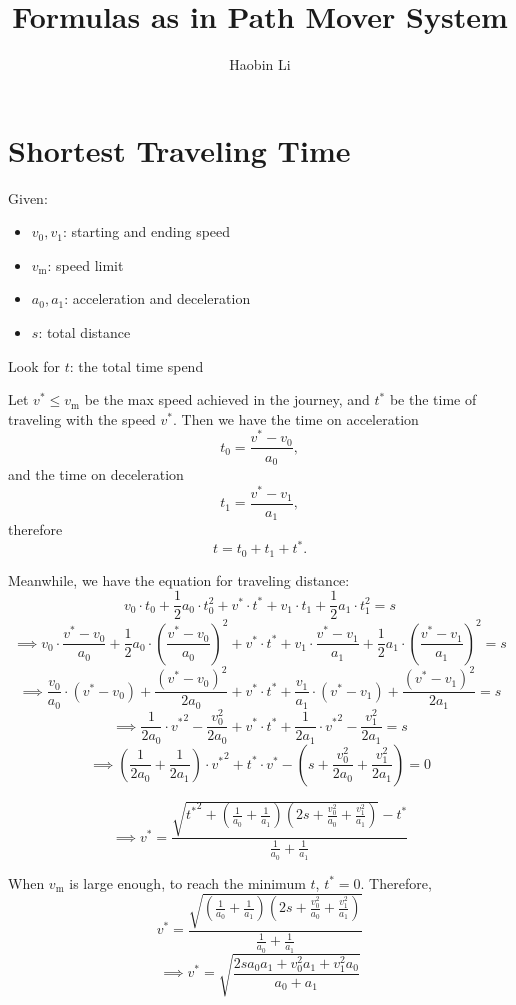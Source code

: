 \documentclass[11pt,a4paper]{article}
\title{Formulas as in Path Mover System}
\author{Haobin Li}
\begin{document}
\maketitle

\section{Shortest Traveling Time}

Given:

\begin{itemize}
	\item $v_0, v_1$: starting and ending speed
	\item $v_\text{m}$: speed limit
	\item $a_0, a_1$: acceleration and deceleration
	\item $s$: total distance
\end{itemize}

Look for $t$: the total time spend

Let $v^* \leq v_\text{m}$ be the max speed achieved in the journey, and $t^*$ be the time of traveling with the speed $v^*$. Then we have the time on acceleration $$ t_0 = \frac{v^* - v_0}{a_0},$$ and the time on deceleration $$ t_1 = \frac{v^* - v_1}{a_1},$$ therefore $$ t = t_0 + t_1 + t^*.$$

Meanwhile, we have the equation for traveling distance:
$$ v_0 \cdot t_0 + \frac{1}{2} a_0 \cdot t_0 ^2  + v^* \cdot t^* + v_1 \cdot t_1 + \frac{1}{2} a_1 \cdot t_1 ^2 = s$$
$$ \implies  v_0 \cdot \frac{v^* - v_0}{a_0} + \frac{1}{2} a_0 \cdot \left(\frac{v^* - v_0}{a_0}\right) ^2  + v^* \cdot t^* + v_1 \cdot \frac{v^* - v_1}{a_1} + \frac{1}{2} a_1 \cdot \left(\frac{v^* - v_1}{a_1}\right) ^2 = s$$
$$ \implies \frac{v_0}{a_0} \cdot \left(v^* - v_0\right) + \frac{\left(v^* - v_0\right)^2}{2 a_0}  + v^* \cdot t^* + \frac{v_1}{a_1} \cdot \left(v^* - v_1\right) + \frac{\left(v^* - v_1\right)^2}{2 a_1} = s$$
$$ \implies   
\frac{1}{2 a_0} \cdot {v^*}^2 - \frac{v_0^2}{2 a_0}
+ v^* \cdot t^* + 
\frac{1}{2 a_1} \cdot {v^*}^2 - \frac{v_1^2}{2 a_1}
= s$$
$$ \implies   
\left(\frac{1}{2 a_0} + \frac{1}{2 a_1}\right) \cdot {v^*}^2 
+ t^* \cdot v^* 
- \left(s + \frac{v_0^2}{2 a_0} + \frac{v_1^2}{2 a_1}\right) 
= 0$$

$$ \implies   
v^* = \frac{\sqrt{{t^*}^2 + \left(\frac{1}{a_0} + \frac{1}{a_1}\right) \left(2s + \frac{v_0^2}{a_0} + \frac{v_1^2}{a_1}\right)} - t^*}{\frac{1}{a_0} + \frac{1}{a_1}}
$$


When $v_\text{m}$ is large enough, to reach the minimum $t$, $t^* = 0$. Therefore, 
$$ v^* = \frac{\sqrt{\left(\frac{1}{a_0} + \frac{1}{a_1}\right) \left(2s + \frac{v_0^2}{a_0} + \frac{v_1^2}{a_1}\right)}}{\frac{1}{a_0} + \frac{1}{a_1}}$$
$$\implies v^* = \sqrt{\frac{2s a_0 a_1 + v_0^2 a_1 + v_1^2 a_0}{a_0 + a_1}}$$
\end{document}
